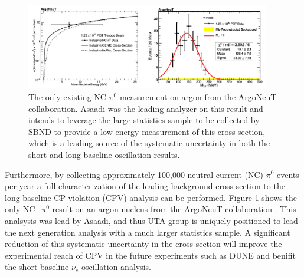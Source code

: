 \begin{figure}[htb]
\centering
\includegraphics[width=0.95\textwidth]{images/ArgoNeuTPizeroResult.png}
\caption[]{The only existing NC-$\pi^0$ measurement on argon from the ArgoNeuT collaboration. Asaadi was the leading analyzer on this result and intends to leverage the large statistics sample to be collected by SBND to provide a low energy measurement of this cross-section, which is a leading source of the systematic uncertainty in both the short and long-baseline oscillation results.}
\label{fig:argoneutpizero}
\end{figure} 

Furthermore, by collecting approximately 100,000 neutral current (NC) $\pi^{0}$ events per year a full characterization of the leading background cross-section to the long baseline CP-violation (CPV) analysis can be performed. Figure \ref{fig:argoneutpizero} shows the only NC$-\pi^0$ result on an argon nucleus from the ArgoNeuT collaboration \cite{Argoneut}. This analsysis was lead by Asaadi, and thus UTA group is uniquely positioned to lead the next generation analysis with a much larger statistics sample. A significant reduction of this systematic uncertainty in the cross-section will improve the experimental reach of CPV in the future experiments such as DUNE and benifit the short-baseline $\nu_{e}$ oscillation analysis.
